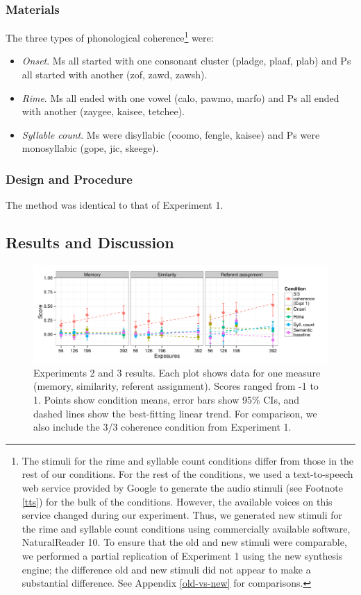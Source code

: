 \documentclass[man,floatsintext]{apa6}
\begin{document}
\subsubsection{Materials}
The three types of phonological coherence\footnote{\label{change-of-stimuli} The stimuli for the rime and syllable count conditions differ from those in the rest of our conditions. For the rest of the conditions, we used a text-to-speech web service provided by Google to generate the audio stimuli (see Footnote \ref{tts}) for the bulk of the conditions. However, the available voices on this service changed during our experiment. Thus, we generated new stimuli for the rime and syllable count conditions using commercially available software, NaturalReader 10. To ensure that the old and new stimuli were comparable, we performed a partial replication of Experiment 1 using the new synthesis engine; the difference old and new stimuli did not appear to make a substantial difference. See Appendix \ref{old-vs-new} for comparisons.} were:

\begin{itemize}
\item \emph{Onset}. Ms all started with one consonant cluster (pladge, plaaf, plab) and Ps all started with another (zof, zawd, zawsh).
\item \emph{Rime}. Ms all ended with one vowel (calo, pawmo, marfo) and Ps all ended with another (zaygee, kaisee, tetchee).
\item \emph{Syllable count}. Ms were disyllabic (coomo, fengle, kaisee) and Ps were monosyllabic (gope, jic, skeege).
\end{itemize}

\subsubsection{Design and Procedure}
The method was identical to that of Experiment 1.

\subsection{Results and Discussion}

\begin{figure}[t]
  \begin{center}
    \includegraphics[width=1.0\linewidth]{x23}
    \caption{Experiments 2 and 3 results. Each plot shows data for one measure (memory, similarity, referent assignment). Scores ranged from -1 to 1. Points show condition means, error bars show 95\% CIs, and dashed lines show the best-fitting linear trend. For comparison, we also include the 3/3 coherence condition from Experiment 1.}
    \label{expt23-results}
  \end{center}
\end{figure}
\end{document}
